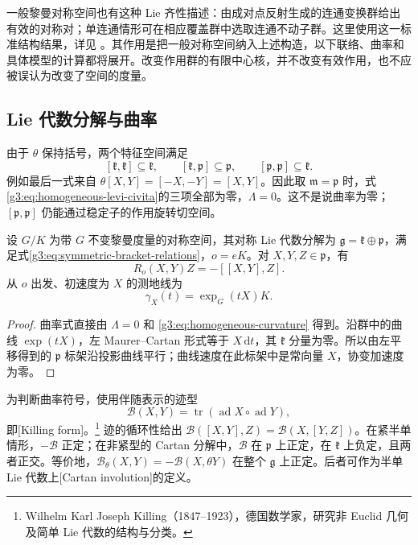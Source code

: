 \ProseParagraphBreak

一般黎曼对称空间也有这种 Lie 齐性描述：由成对点反射生成的连通变换群给出有效的对称对；单连通情形可在相应覆盖群中选取连通不动子群。这里使用这一标准结构结果，详见 \cite[第II章第1--2节、第IV章第1节]{Loos1969SymmetricI}。其作用是把一般对称空间纳入上述构造，以下联络、曲率和具体模型的计算都将展开。改变作用群的有限中心核，并不改变有效作用，也不应被误认为改变了空间的度量。

\subsection{Lie 代数分解与曲率}
\label{g3:subsec:0504:03}

由于 \(\theta\) 保持括号，两个特征空间满足
\begin{equation}\label{g3:eq:symmetric-bracket-relations}
	[\mathfrak k,\mathfrak k]\subseteq\mathfrak k,
	\qquad[\mathfrak k,\mathfrak p]\subseteq\mathfrak p,
	\qquad[\mathfrak p,\mathfrak p]\subseteq\mathfrak k.
\end{equation}
例如最后一式来自 \(\theta[X,Y]=[-X,-Y]=[X,Y]\)。因此取 \(\mathfrak m=\mathfrak p\) 时，式\eqref{g3:eq:homogeneous-levi-civita}的三项全部为零，\(\Lambda=0\)。这不是说曲率为零；\([\mathfrak p,\mathfrak p]\) 仍能通过稳定子的作用旋转切空间。

\begin{proposition}\label{g3:prop:symmetric-curvature-bracket}
	设 \(G/K\) 为带 \(G\) 不变黎曼度量的对称空间，其对称 Lie 代数分解为 \(\mathfrak g=\mathfrak k\oplus\mathfrak p\)，满足式\eqref{g3:eq:symmetric-bracket-relations}，\(o=eK\)。对 \(X,Y,Z\in\mathfrak p\)，有
	\begin{equation}\label{g3:eq:symmetric-curvature-bracket}
		R_o(X,Y)Z=-[[X,Y],Z].
	\end{equation}
	从 \(o\) 出发、初速度为 \(X\) 的测地线为
	\begin{equation}\label{g3:eq:symmetric-geodesic}
		\gamma_X(t)=\exp_G(tX)K.
	\end{equation}
\end{proposition}
\begin{proof}
	曲率式直接由 \(\Lambda=0\) 和 \eqref{g3:eq:homogeneous-curvature} 得到。沿群中的曲线 \(\exp(tX)\)，左 Maurer--Cartan 形式等于 \(X\,\mathrm dt\)，其 \(\mathfrak k\) 分量为零。所以由左平移得到的 \(\mathfrak p\) 标架沿投影曲线平行；曲线速度在此标架中是常向量 \(X\)，协变加速度为零。
\end{proof}

为判断曲率符号，使用伴随表示的迹型
\[
	\mathcal B(X,Y)=\operatorname{tr}(\operatorname{ad}X\circ\operatorname{ad}Y),
\]
即[Killing form]。\footnote{Wilhelm Karl Joseph Killing（1847--1923），德国数学家，研究非 Euclid 几何及简单 Lie 代数的结构与分类。}
迹的循环性给出 \(\mathcal B([X,Y],Z)=\mathcal B(X,[Y,Z])\)。在紧半单情形，\(-\mathcal B\) 正定；在非紧型的 Cartan 分解中，\(\mathcal B\) 在 \(\mathfrak p\) 上正定，在 \(\mathfrak k\) 上负定，且两者正交。等价地，\(\mathcal B_\theta(X,Y)=-\mathcal B(X,\theta Y)\) 在整个 \(\mathfrak g\) 上正定。后者可作为半单 Lie 代数上[Cartan involution]的定义。

